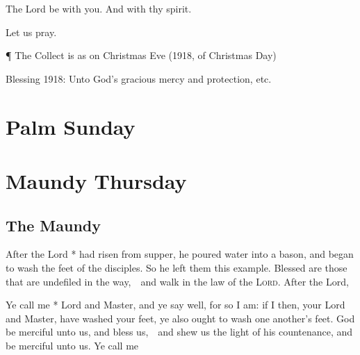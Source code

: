 \V The Lord be with you. \R And with thy spirit.

\centerline{Let us pray.}

¶ The {Collect} is as on Christmas Eve
(1918, of Christmas Day)

Blessing
1918: Unto God's gracious mercy and protection, etc.


\medskip

\fleuron

\bigskip



\section{Palm Sunday}
\section{Maundy Thursday}

\subsection{The Maundy}
\ant After the Lord * had risen from supper, he poured water into a bason, and began to wash the feet of the disciples. So he left them this example.  Blessed are those that are undefiled in the way,\ \star\ and walk in the law of the {\scshape Lord}.  After the Lord, \etc

\ant Ye call me * Lord and Master, and ye say well, for so I am: if I then, your Lord and Master, have washed your feet, ye also ought to wash one another’s feet.  God be merciful unto us, and bless us,\ \star\ and shew us the light of his countenance, and be merciful unto us.  Ye call me \etc

